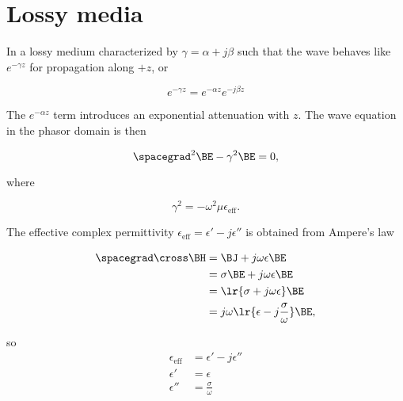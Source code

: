 %
%
\section{Lossy media}

In a lossy medium characterized by \( \gamma = \alpha + j \beta \) such that the wave behaves like \( e^{-\gamma z } \) for propagation along \( +z \), or

\begin{equation}\label{eqn:uwavesLecture3:20}
e^{-\gamma z} = e^{-\alpha z} e^{-j \beta z}
\end{equation}

The \( e^{-\alpha z} \) term introduces an exponential attenuation with \( z \).  The wave equation in the phasor domain is then

\begin{equation}\label{eqn:uwavesLecture3:40}
\spacegrad^2 \BE - \gamma^2 \BE = 0,
\end{equation}

where

\begin{equation}\label{eqn:uwavesLecture3:60}
\gamma^2 = - \omega^2 \mu \epsilon_{\mathrm{eff}}.
\end{equation}

The effective complex permittivity \( \epsilon_{\mathrm{eff}} = \epsilon' -j \epsilon'' \) is obtained from Ampere's law

\begin{equation}\label{eqn:uwavesLecture3:80}
\begin{aligned}
\spacegrad \cross \BH
&= \BJ + j \omega \epsilon \BE
\\ &= \sigma \BE + j \omega \epsilon \BE
\\ &= \lr{ \sigma + j \omega \epsilon } \BE
\\ &= j \omega \lr{ \epsilon -j \frac{\sigma}{\omega} } \BE ,
\end{aligned}
\end{equation}

so
\begin{equation}\label{eqn:uwavesLecture3:100}
\begin{aligned}
\epsilon_{\mathrm{eff}} &= \epsilon' -j \epsilon'' \\
\epsilon' &= \epsilon \\
\epsilon'' &= \frac{\sigma}{\omega}
\end{aligned}
\end{equation}

